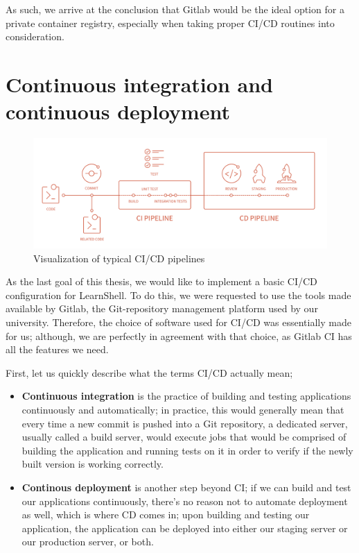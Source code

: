 \documentclass[thesis=B,english]{FITthesis}[2019/12/23]
\begin{document}
As such, we arrive at the conclusion that Gitlab would be the ideal option for a private container registry, especially when taking proper CI/CD routines into consideration.

\clearpage

\section{Continuous integration and continuous deployment}

\begin{figure}[H]
\centering
\caption{Visualization of typical CI/CD pipelines \cite{cicd-diagram}}
\hspace*{-2cm}
\includegraphics[scale=0.3]{cicd}
\end{figure}

As the last goal of this thesis, we would like to implement a basic CI/CD configuration for LearnShell. To do this, we were requested to use the tools made available by Gitlab, the Git-repository management platform used by our university. Therefore, the choice of software used for CI/CD was essentially made for us; although, we are perfectly in agreement with that choice, as Gitlab CI has all the features we need.

First, let us quickly describe what the terms CI/CD actually mean;

\begin{itemize}
  \setlength\itemsep{0em}
  \item \textbf{Continuous integration} is the practice of building and testing applications continuously and automatically; in practice, this would generally mean that every time a new commit is pushed into a Git repository, a dedicated server, usually called a build server, would execute jobs that would be comprised of building the application and running tests on it in order to verify if the newly built version is working correctly.
  \item \textbf{Continous deployment} is another step beyond CI; if we can build and test our applications continuously, there's no reason not to automate deployment as well, which is where CD comes in; upon building and testing our application, the application can be deployed into either our staging server or our production server, or both. \cite{cd-guide}
\end{itemize}
 
\end{document}
